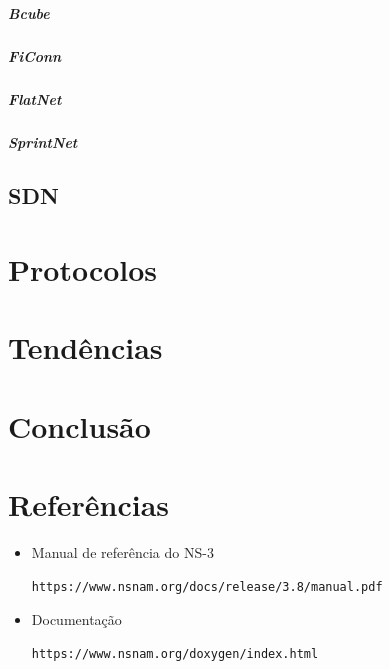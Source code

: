 \documentclass[12pt,a4paper]{report}
\begin{document}
\paragraph{Bcube}
\paragraph{FiConn}
\paragraph{FlatNet}
\paragraph{SprintNet}

\section{SDN}

\chapter{Protocolos}

\chapter{Tendências}

\chapter{Conclusão}

\chapter{Referências}

\begin{itemize}
\item Manual de referência do NS-3 \begin{verbatim}https://www.nsnam.org/docs/release/3.8/manual.pdf\end{verbatim}
\item Documentação \begin{verbatim}https://www.nsnam.org/doxygen/index.html\end{verbatim}
\end{itemize}
\end{document}
